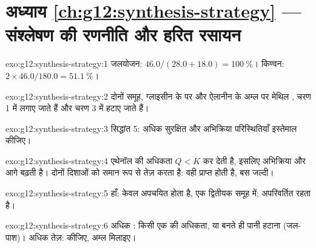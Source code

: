 \section*{अध्याय \ref{ch:g12:synthesis-strategy} --- संश्लेषण की रणनीति और हरित रसायन}

\begin{solution}{exo:g12:synthesis-strategy:1}
जलयोजन: $46.0/(28.0 + 18.0) = \qty{100}{\percent}$। किण्वन:
$2 \times 46.0/180.0 = \qty{51.1}{\percent}$।
\end{solution}

\begin{solution}{exo:g12:synthesis-strategy:2}
दोनों समूह, ग्लाइसीन के  पर  और ऐलानीन के अम्ल पर मेथिल ,
चरण 1 में लगाए जाते हैं और चरण 3 में हटाए जाते हैं।
\end{solution}

\begin{solution}{exo:g12:synthesis-strategy:3}
सिद्धांत 5: अधिक सुरक्षित  और अभिक्रिया परिस्थितियाँ इस्तेमाल कीजिए।
\end{solution}

\begin{solution}{exo:g12:synthesis-strategy:4}
एथेनॉल की अधिकता $Q < K$ कर देती है, इसलिए अभिक्रिया और आगे
बढ़ती है।  दोनों दिशाओं को समान रूप से तेज़ करता है: वही  प्राप्त होती है, बस जल्दी।
\end{solution}

\begin{solution}{exo:g12:synthesis-strategy:5}
हाँ: केवल  अपचयित होता है, एक द्वितीयक  समूह में;
 अपरिवर्तित रहता है।
\end{solution}

\begin{solution}{exo:g12:synthesis-strategy:6}
अधिक : किसी एक  की अधिकता, या बनते ही पानी हटाना (जल-पाश)।
अधिक तेज़:  कीजिए, अम्ल  मिलाइए।
\end{solution}

